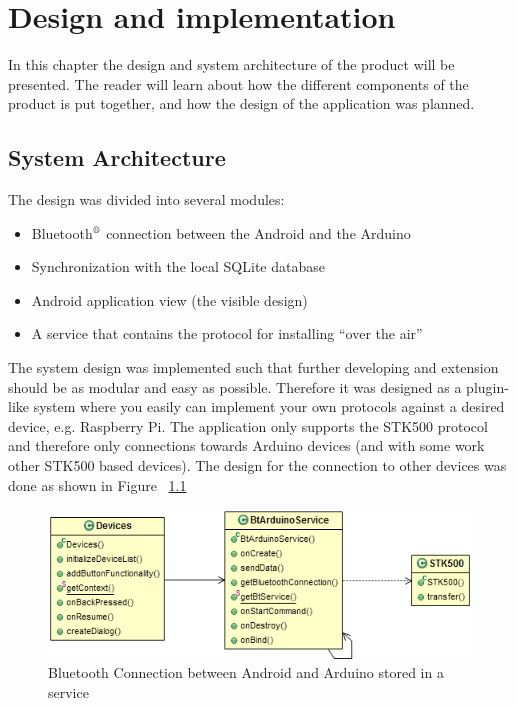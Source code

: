 \chapter{Design and implementation}
In this chapter the design and system architecture of the product will be presented. The reader will learn about how the different components of the product is put together, and how the design of the application was planned.

\section{System Architecture}
	The design was divided into several modules:
	\begin{itemize}
		\item{Bluetooth$\textsuperscript{\textregistered}$ connection between the Android and the Arduino}
		\item{Synchronization with the local SQLite database}
		\item{Android application view (the visible design)}
		\item{A service that contains the protocol for installing ``over the air''}
	\end{itemize}
	\vspace{0.2in}
	
	The system design was implemented such that further developing and extension should be as modular and easy as possible.
	Therefore it was designed as a plugin-like system where you easily can implement your own protocols against a desired device, e.g. Raspberry Pi. The application only supports the STK500 protocol and therefore only connections towards Arduino devices (and with some work other STK500 based devices).
	The design for the connection to other devices was done as shown in Figure ~\ref{fig:btconnection}\\

	\begin{figure}[H]
	\centering
	\includegraphics[width=130mm]{images/BTConnection.png}
	\caption{Bluetooth Connection between Android and Arduino stored in a service}
	\label{fig:btconnection}
	\end{figure}

